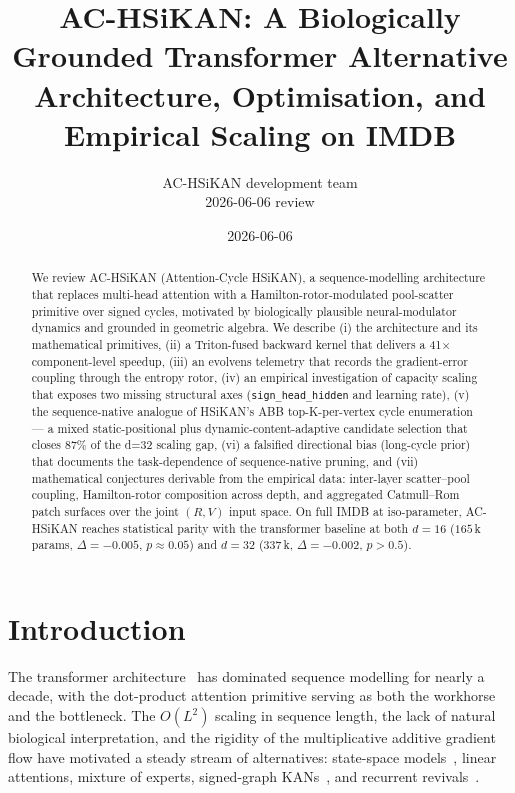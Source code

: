 \documentclass[10pt,a4paper]{article}
\title{AC-HSiKAN: A Biologically Grounded Transformer Alternative\\
       \large Architecture, Optimisation, and Empirical Scaling on IMDB}
\author{
  AC-HSiKAN development team\\
  \small {2026-06-06 review}
}
\date{2026-06-06}
\begin{document}
\maketitle

\begin{abstract}
We review AC-HSiKAN (Attention-Cycle HSiKAN), a sequence-modelling
architecture that replaces multi-head attention with a Hamilton-rotor-modulated
pool-scatter primitive over signed cycles, motivated by biologically plausible
neural-modulator dynamics and grounded in geometric algebra. We describe
(i) the architecture and its mathematical primitives, (ii) a Triton-fused
backward kernel that delivers a 41$\times$ component-level speedup,
(iii) an evolvens telemetry that records the gradient-error coupling
through the entropy rotor, (iv) an empirical investigation of capacity
scaling that exposes two missing structural axes (\texttt{sign\_head\_hidden} and
learning rate), (v) the sequence-native analogue of HSiKAN's ABB
top-K-per-vertex cycle enumeration --- a mixed static-positional plus
dynamic-content-adaptive candidate selection that closes 87\% of the
d=32 scaling gap, (vi) a falsified directional bias (long-cycle prior)
that documents the task-dependence of sequence-native pruning,
and (vii) mathematical conjectures derivable from the empirical
data: inter-layer scatter--pool coupling, Hamilton-rotor composition
across depth, and aggregated Catmull--Rom patch surfaces over the
joint $(R, V)$ input space. On full IMDB at iso-parameter, AC-HSiKAN
reaches statistical parity with the transformer baseline at both
$d=16$ ($165\,$k params, $\Delta = -0.005$, $p \approx 0.05$) and
$d=32$ ($337\,$k, $\Delta = -0.002$, $p > 0.5$).
\end{abstract}

\section{Introduction}

The transformer architecture~\cite{vaswani2017attention} has dominated
sequence modelling for nearly a decade, with the dot-product attention
primitive serving as both the workhorse and the bottleneck. The
$O(L^2)$ scaling in sequence length, the lack of natural biological
interpretation, and the rigidity of the multiplicative additive
gradient flow have motivated a steady stream of alternatives:
state-space models~\cite{gu2021combining}, linear attentions, mixture
of experts, signed-graph KANs~\cite{previous-hsikan}, and recurrent
revivals~\cite{retnet}.
\end{document}
